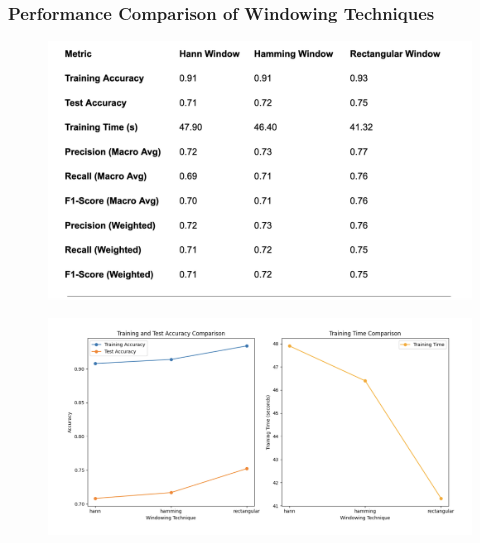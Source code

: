 \documentclass[a4paper,12pt]{article}
\begin{document}
        \subsubsection{Performance Comparison of Windowing Techniques}
            \begin{figure}[H]
                \centering
                \includegraphics[width=1\linewidth]{PerformanceComparison.png}
            \end{figure}
            \begin{figure}[H]
                \centering
                \includegraphics[width=1\linewidth]{PerformanceComparisonChart.png}
            \end{figure}
\end{document}
